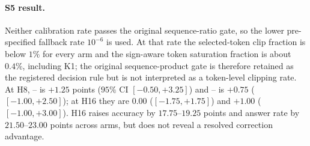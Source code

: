 \begin{table}[t]
\caption{Prospectively frozen S5 best-of-2 low-update confirmation with token-level stability diagnostics. Evaluation entries pool 400 sealed examples over two seeds; stability entries are medians over two seeds and two rounds. ``Seq.'' is the logged product-ratio diagnostic, whereas ``Tok.'' measures selected Actor tokens.}
\label{tab:s5-stable}
\centering
\scriptsize
{}
\end{table}
\paragraph{S5 result.}
Neither calibration rate passes the original sequence-ratio gate, so the lower pre-specified fallback rate \(10^{-6}\) is used. At that rate the selected-token clip fraction is below \(1\%\) for every arm and the sign-aware token saturation fraction is about \(0.4\%\), including K1; the original sequence-product gate is therefore retained as the registered decision rule but is not interpreted as a token-level clipping rate. At H8, \Eone{}--\Ezero{} is \(+1.25\) points (\(95\%\) CI \([-0.50,+3.25]\)) and \Ethree{}--\Ezero{} is \(+0.75\) (\([-1.00,+2.50]\)); at H16 they are \(0.00\) (\([-1.75,+1.75]\)) and \(+1.00\) (\([-1.00,+3.00]\)). H16 raises accuracy by \(17.75\)--\(19.25\) points and answer rate by \(21.50\)--\(23.00\) points across arms, but does not reveal a resolved correction advantage.

